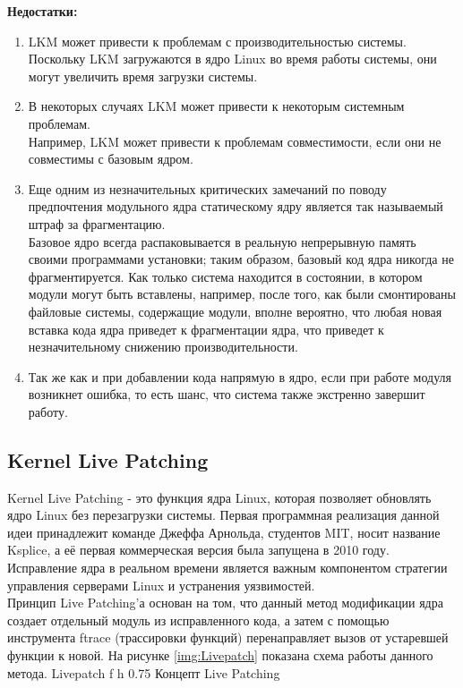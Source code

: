 \textbf{Недостатки:}
\begin{enumerate}
    \item LKM может привести к проблемам с производительностью системы. \vspace{1mm}\\
    Поскольку LKM загружаются в ядро Linux во время работы системы, они могут увеличить время загрузки системы.
    \item В некоторых случаях LKM может привести к некоторым системным проблемам. \vspace{1mm}\\
    Например, LKM может привести к проблемам совместимости, если они не совместимы с базовым ядром.
    \item Еще одним из незначительных критических замечаний по поводу предпочтения модульного ядра статическому ядру является так называемый штраф за фрагментацию. \vspace{1mm}\\
    Базовое ядро всегда распаковывается в реальную непрерывную память своими программами установки;
    таким образом, базовый код ядра никогда не фрагментируется.
    Как только система находится в состоянии, в котором модули могут быть вставлены, например, после того, как были смонтированы файловые системы, содержащие модули, вполне вероятно,
    что любая новая вставка кода ядра приведет к фрагментации ядра, что приведет к незначительному снижению производительности.
    \item Так же как и при добавлении кода напрямую в ядро, если при работе модуля возникнет ошибка, то есть шанс, что система также экстренно завершит работу.
\end{enumerate}

\subsection{Kernel Live Patching}\label{subsec:kernel-live-patching}

Kernel Live Patching - это функция ядра Linux, которая позволяет обновлять ядро Linux без перезагрузки системы.
Первая программная реализация данной идеи принадлежит команде Джеффа Арнольда, студентов MIT, носит название Ksplice\cite{ksplice}, а её первая коммерческая версия была запущена в 2010 году.
Исправление ядра в реальном времени является важным компонентом стратегии управления серверами Linux и устранения уязвимостей.
\\
Принцип Live Patching'а основан на том, что данный метод модификации ядра создает отдельный модуль из исправленного кода, а затем с помощью инструмента ftrace (трассировки функций) перенаправляет вызов от устаревшей функции к новой.
На рисунке \ref{img:Livepatch} показана схема работы данного метода.
{Livepatch} %
{f}
{h}
{0.75\textwidth} %
{Концепт Live Patching} %

